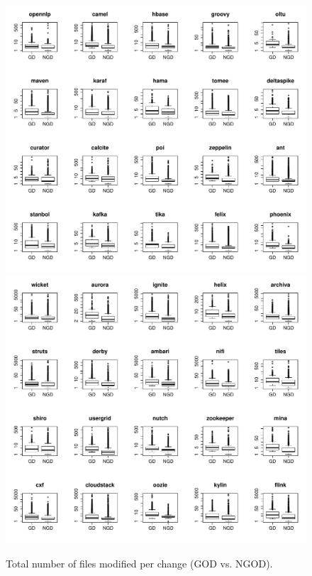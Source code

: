 \begin{figure}[tb]
	\centering
	\includegraphics[width=120mm]{figures/chapter4/rq3_god_nf_logged_1}
	\includegraphics[width=120mm]{figures/chapter4/rq3_god_nf_logged_2}
	\caption{Total number of files modified per change (GOD vs. NGOD).}
	\label{figure:total_files_god_vs_ngod}
\end{figure}


